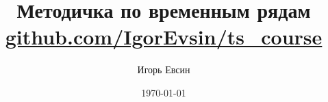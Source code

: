 
\title{Методичка по временным рядам  \\
  \vspace{0.5cm}
  \small
\href{https://github.com/IgorEvsin/ts_course}{github.com/IgorEvsin/ts\_course}}
\author{Игорь Евсин}
\date{\today}

\maketitle

\newpage
{}
\tableofcontents
\newpage
{}